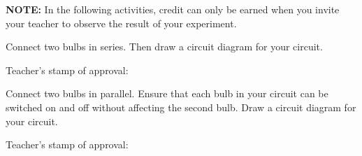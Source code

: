 \documentclass[answers]{exam}
\begin{document}
\begin{questions}
\begin{EnvUplevel}
    \textbf{NOTE:} In the following activities, credit can only be earned when you invite your teacher to observe the result of your experiment.
\end{EnvUplevel}

\question
Connect two bulbs in series. Then draw a circuit diagram for your circuit.

\begin{center}
\hspace{5mm}
\begin{minipage}{4cm}
\centering
Teacher's stamp of approval: \fillin[][2em]
\end{minipage}
\end{center}



\question
Connect two bulbs in parallel. Ensure that each bulb in your circuit can be switched on and off without affecting the second bulb. Draw a circuit diagram for your circuit.

\begin{center}
\hspace{5mm}
\begin{minipage}{4cm}
\centering
Teacher's stamp of approval: \fillin[][2em]
\end{minipage}
\end{center}




\end{questions}
\end{document}
